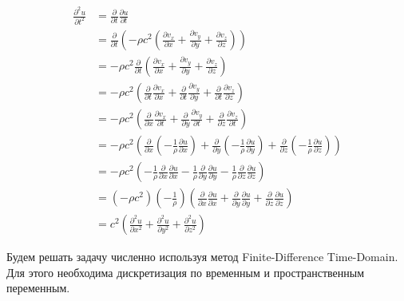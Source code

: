 \begin{align*}
    \frac{\partial^2 u}{\partial t^2}
    &= \frac{\partial}{\partial t} \frac{\partial u}{\partial t} \\
    &=
    \frac{\partial}{\partial t}
    \left(
    -
    \rho
    c^2
    \left(
    \frac{\partial v_x}{\partial x}
    + \frac{\partial v_y}{\partial y}
    + \frac{\partial v_z}{\partial z}
    \right)
    \right)
    \\
    &=
    - \rho c^2
    \frac{\partial}{\partial t}
    \left(
    \frac{\partial v_x}{\partial x}
    + \frac{\partial v_y}{\partial y}
    + \frac{\partial v_z}{\partial z}
    \right)
    \\
    &=
    - \rho c^2
    \left(
    \frac{\partial}{\partial t} \frac{\partial v_x}{\partial x}
    + \frac{\partial}{\partial t} \frac{\partial v_y}{\partial y}
    + \frac{\partial}{\partial t} \frac{\partial v_z}{\partial z}
    \right)
    \\
    &=
    - \rho c^2
    \left(
    \frac{\partial}{\partial x} \frac{\partial v_x}{\partial t}
    + \frac{\partial}{\partial y} \frac{\partial v_y}{\partial t}
    + \frac{\partial}{\partial z} \frac{\partial v_z}{\partial t}
    \right)
    \\
    &=
    - \rho c^2
    \left(
    \frac{\partial}{\partial x}
    \left( - \frac{1}{\rho} \frac{\partial u}{\partial x} \right)
    + \frac{\partial}{\partial y}
    \left( - \frac{1}{\rho} \frac{\partial u}{\partial y} \right)
    + \frac{\partial}{\partial z}
    \left( - \frac{1}{\rho} \frac{\partial u}{\partial z} \right)
    \right)
    \\
    &=
    - \rho c^2
    \left(
    - \frac{1}{\rho} \frac{\partial}{\partial x} \frac{\partial u}{\partial x}
    - \frac{1}{\rho} \frac{\partial}{\partial y} \frac{\partial u}{\partial y}
    - \frac{1}{\rho} \frac{\partial}{\partial z} \frac{\partial u}{\partial z}
    \right)
    \\
    &=
    \left( - \rho c^2 \right) \left( - \frac{1}{\rho} \right)
    \left(
    \frac{\partial}{\partial x} \frac{\partial u}{\partial x}
    + \frac{\partial}{\partial y} \frac{\partial u}{\partial y}
    + \frac{\partial}{\partial z} \frac{\partial u}{\partial z}
    \right)
    \\
    &=
    c^2
    \left(
    \frac{\partial^2 u}{\partial x^2}
    + \frac{\partial^2 u}{\partial y^2}
    + \frac{\partial^2 u}{\partial z^2}
    \right)
\end{align*}

Будем решать задачу численно используя метод Finite-Difference Time-Domain.
Для этого необходима дискретизация по временным и пространственным переменным.

